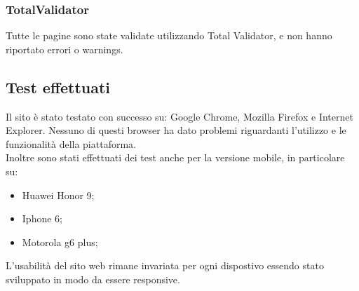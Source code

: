 \subsubsection{TotalValidator}
Tutte le pagine sono state validate utilizzando Total Validator, e non hanno riportato errori o warnings.


\subsection{Test effettuati}
Il sito è stato testato con successo su: Google Chrome, Mozilla Firefox e Internet Explorer. Nessuno di questi browser ha dato problemi riguardanti l'utilizzo e le funzionalità della piattaforma.
\\Inoltre sono stati effettuati dei test anche per la versione mobile, in particolare su:
\begin{itemize}
	\item Huawei Honor 9;
	\item Iphone 6; 
	\item Motorola g6 plus;
\end{itemize}
L’usabilità del sito web rimane invariata per ogni dispostivo essendo stato sviluppato in modo da essere responsive.
